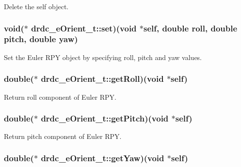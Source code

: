 Delete the self object. 

\hypertarget{structdrdc__eOrient__t_75a0e0e07f9be15a987a776c139a9362}{
\subsubsection[set]{\setlength{\rightskip}{0pt plus 5cm}void($\ast$ {\bf drdc\_\-eOrient\_\-t::set})(void $\ast$self, double roll, double pitch, double yaw)}}
\label{structdrdc__eOrient__t_75a0e0e07f9be15a987a776c139a9362}


Set the Euler RPY object by specifying roll, pitch and yaw values. 

\hypertarget{structdrdc__eOrient__t_ffdb69bf51a40a9c4d860360ab87ec52}{
\subsubsection[getRoll]{\setlength{\rightskip}{0pt plus 5cm}double($\ast$ {\bf drdc\_\-eOrient\_\-t::getRoll})(void $\ast$self)}}
\label{structdrdc__eOrient__t_ffdb69bf51a40a9c4d860360ab87ec52}


Return roll component of Euler RPY. 

\hypertarget{structdrdc__eOrient__t_4af87907ffb2295b0fa044b185e8488d}{
\subsubsection[getPitch]{\setlength{\rightskip}{0pt plus 5cm}double($\ast$ {\bf drdc\_\-eOrient\_\-t::getPitch})(void $\ast$self)}}
\label{structdrdc__eOrient__t_4af87907ffb2295b0fa044b185e8488d}


Return pitch component of Euler RPY. 

\hypertarget{structdrdc__eOrient__t_8037a80813d6a996bc85223fc4136ede}{
\subsubsection[getYaw]{\setlength{\rightskip}{0pt plus 5cm}double($\ast$ {\bf drdc\_\-eOrient\_\-t::getYaw})(void $\ast$self)}}
\label{structdrdc__eOrient__t_8037a80813d6a996bc85223fc4136ede}


